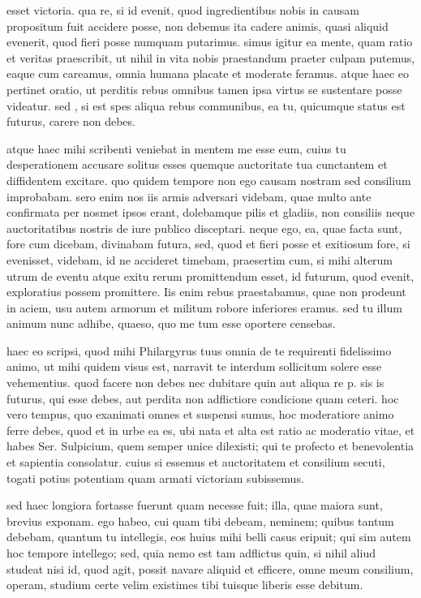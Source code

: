  esset victoria. qua re, si id evenit, quod ingredientibus nobis in causam propositum fuit accidere posse, non debemus ita cadere animis, quasi aliquid evenerit, quod fieri posse numquam putarimus. simus igitur ea mente, quam ratio et veritas praescribit, ut nihil in vita nobis praestandum praeter culpam putemus, eaque cum careamus, omnia humana placate et moderate feramus. atque haec eo pertinet oratio, ut perditis rebus omnibus tamen ipsa virtus se sustentare posse videatur. sed , si est spes aliqua rebus communibus, ea tu, quicumque status est futurus, carere non debes.

 atque haec mihi scribenti veniebat in mentem me esse eum, cuius tu desperationem accusare solitus esses quemque auctoritate tua cunctantem et diffidentem excitare. quo quidem tempore non ego causam nostram sed consilium improbabam. sero enim nos iis armis adversari videbam, quae multo ante confirmata per nosmet ipsos erant, dolebamque pilis et gladiis, non consiliis neque auctoritatibus nostris de iure publico disceptari. neque ego, ea, quae facta sunt, fore cum dicebam, divinabam futura, sed, quod et fieri posse et exitiosum fore, si evenisset, videbam, id ne accideret timebam, praesertim cum, si mihi alterum utrum de eventu atque exitu rerum promittendum esset, id futurum, quod evenit, exploratius possem promittere. Iis enim rebus praestabamus, quae non prodeunt in aciem, usu autem armorum et militum robore inferiores eramus. sed tu illum animum nunc adhibe, quaeso, quo me tum esse oportere censebas.

 haec eo scripsi, quod mihi Philargyrus tuus omnia de te requirenti fidelissimo animo, ut mihi quidem visus est, narravit te interdum sollicitum solere esse vehementius. quod facere non debes nec dubitare quin aut aliqua re p. sis is futurus, qui esse debes, aut perdita non adflictiore condicione quam ceteri. hoc vero tempus, quo exanimati omnes et suspensi sumus, hoc moderatiore animo ferre debes, quod et in urbe ea es, ubi nata et alta est ratio ac moderatio vitae, et habes Ser. Sulpicium, quem semper unice dilexisti; qui te profecto et benevolentia et sapientia consolatur. cuius si essemus et auctoritatem et consilium secuti, togati potius potentiam quam armati victoriam subissemus.

 sed haec longiora fortasse fuerunt quam necesse fuit; illa, quae maiora sunt, brevius exponam. ego habeo, cui quam tibi debeam, neminem; quibus tantum debebam, quantum tu intellegis, eos huius mihi belli casus eripuit; qui sim autem hoc tempore intellego; sed, quia nemo est tam adflictus quin, si nihil aliud studeat nisi id, quod agit, possit navare aliquid et efficere, omne meum consilium, operam, studium certe velim existimes tibi tuisque liberis esse debitum.
